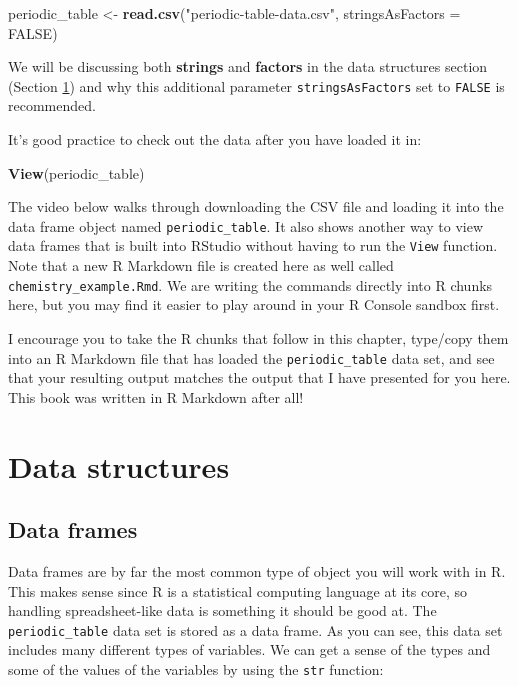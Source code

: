 \documentclass[]{tufte-book}
\newenvironment{Shaded}{\begin{snugshade}}{\end{snugshade}}
\newcommand{\DataTypeTok}[1]{\textcolor[rgb]{0.13,0.29,0.53}{#1}}
\newcommand{\KeywordTok}[1]{\textcolor[rgb]{0.13,0.29,0.53}{\textbf{#1}}}
\newcommand{\NormalTok}[1]{#1}
\newcommand{\OtherTok}[1]{\textcolor[rgb]{0.56,0.35,0.01}{#1}}
\newcommand{\StringTok}[1]{\textcolor[rgb]{0.31,0.60,0.02}{#1}}
\begin{document}
\begin{Shaded}
\begin{Highlighting}[]
\NormalTok{periodic\_table <{-}}\StringTok{ }\KeywordTok{read.csv}\NormalTok{(}\StringTok{"periodic{-}table{-}data.csv"}\NormalTok{,}
              \DataTypeTok{stringsAsFactors =} \OtherTok{FALSE}\NormalTok{)}
\end{Highlighting}
\end{Shaded}

We will be discussing both \textbf{strings} and \textbf{factors} in the data structures section (Section \ref{data-structures}) and why this additional parameter \texttt{stringsAsFactors} set to \texttt{FALSE} is recommended.

It's good practice to check out the data after you have loaded it in:

\begin{Shaded}
\begin{Highlighting}[]
\KeywordTok{View}\NormalTok{(periodic\_table)}
\end{Highlighting}
\end{Shaded}

The video below walks through downloading the CSV file and loading it into the data frame object named \texttt{periodic\_table}. It also shows another way to view data frames that is built into RStudio without having to run the \texttt{View} function. Note that a new R Markdown file is created here as well called \texttt{chemistry\_example.Rmd}. We are writing the commands directly into R chunks here, but you may find it easier to play around in your R Console sandbox first.

I encourage you to take the R chunks that follow in this chapter, type/copy them into an R Markdown file that has loaded the \texttt{periodic\_table} data set, and see that your resulting output matches the output that I have presented for you here. This book was written in R Markdown after all!

\hypertarget{data-structures}{%
\section{Data structures}\label{data-structures}}

\hypertarget{data-frames}{%
\subsection{Data frames}\label{data-frames}}

Data frames are by far the most common type of object you will work with in R. This makes sense since R is a statistical computing language at its core, so handling spreadsheet-like data is something it should be good at. The \texttt{periodic\_table} data set is stored as a data frame. As you can see, this data set includes many different types of variables. We can get a sense of the types and some of the values of the variables by using the \texttt{str} function:
\end{document}
